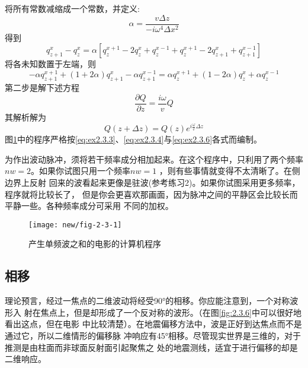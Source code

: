 将所有常数减缩成一个常数，并定义:
\begin{equation}
\alpha=\frac{v\Delta z}{-i\omega^4\Delta x^2}
\label{eq:ex2.3.3}
\end{equation}
得到
\begin{equation*}
q_{z+1}^x-q_z^x=\alpha[q_z^{x+1}-2q_z^x+q_z^{x-1}+q_z^{x+1}-2q_{z+1}^x+q_{z+1}^{x-1}]
\end{equation*}
将各未知数置于左端，则
\begin{equation}
-\alpha q_{z+1}^{x+1}+(1+2\alpha)q_{z+1}^x-\alpha q_{z+1}^{x-1}=\alpha q_z^{x+1}+(1-2\alpha)q_z^x+
\alpha q_z^{x-1}
\label{eq:ex2.3.4}
\end{equation}
第二步是解下述方程
\begin{equation}
\frac{\partial Q}{\partial z}=\frac{i\omega}{v}Q
\label{eq:ex2.3.5}
\end{equation}
其解析解为
\begin{equation}
Q(z+\Delta z)=Q(z)e^{i\frac{\omega}{v}\Delta z}
\label{eq:ex2.3.6}
\end{equation}
图\ref{fig:new/fig-2-3-1}中的程序严格按\ref{eq:ex2.3.3}、\ref{eq:ex2.3.4}与\ref{eq:ex2.3.6}各式而编制。

为作出波动脉冲，须将若干频率成分相加起来。在这个程序中，只利用了两个频率
$nw=2$。如果你试图只用一个频率$nw =1$
，则有些事情就变得不太清晰了。在侧边界上反射
回来的波看起来更像是驻波(参考练习2)。如果你试图采用更多频率，程序就将比较长了，
但是你会更喜欢那画面，因为脉冲之间的平静区会比较长而平静一些。各种频率成分可采用
不同的加权。
\begin{figure}[H]
\centering
\texttt{[image: new/fig-2-3-1]}
\caption[code2-3-1]{产生单频波之和的电影的计算机程序}
\label{fig:new/fig-2-3-1}
\end{figure}

\subsection{相移}
理论预言，经过一焦点的二维波动将经受90°的相移。你应能注意到，一个对称波形入
射在焦点上，但是却形成了一个反对称的波形。（在图\ref{fig:2.3.6}中可以很好地看出这点，但在电影
中比较清楚）。在地震偏移方法中，波是正好到达焦点而不是通过它，所以二维情形的偏移脉
冲响应有45°相移。尽管现实世界是三维的，对于推测是由柱面而非球面反射面引起聚焦之
处的地震测线，适宜于进行偏移的却是二维响应。


